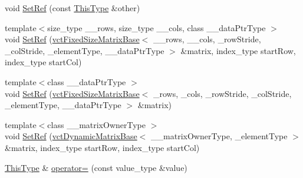 \begin{DoxyCompactItemize}
void \hyperlink{classvct_fixed_size_matrix_ref_aecb4eaa807ae670268091c0473db872e}{Set\-Ref} (const \hyperlink{classvct_fixed_size_matrix_ref_a29a621c8e22f250f9033e539ad219f95}{This\-Type} \&other)
\item 
{\footnotesize template$<$size\-\_\-type \-\_\-\-\_\-rows, size\-\_\-type \-\_\-\-\_\-cols, class \-\_\-\-\_\-data\-Ptr\-Type $>$ }\\void \hyperlink{classvct_fixed_size_matrix_ref_ad738bf0587d297023a179b7c18c9ea4f}{Set\-Ref} (\hyperlink{classvct_fixed_size_matrix_base}{vct\-Fixed\-Size\-Matrix\-Base}$<$ \-\_\-\-\_\-rows, \-\_\-\-\_\-cols, \-\_\-row\-Stride, \-\_\-col\-Stride, \-\_\-element\-Type, \-\_\-\-\_\-data\-Ptr\-Type $>$ \&matrix, index\-\_\-type start\-Row, index\-\_\-type start\-Col)
\item 
{\footnotesize template$<$class \-\_\-\-\_\-data\-Ptr\-Type $>$ }\\void \hyperlink{classvct_fixed_size_matrix_ref_ad34e0c9c7a45009e92ff3a8d83e908f1}{Set\-Ref} (\hyperlink{classvct_fixed_size_matrix_base}{vct\-Fixed\-Size\-Matrix\-Base}$<$ \-\_\-rows, \-\_\-cols, \-\_\-row\-Stride, \-\_\-col\-Stride, \-\_\-element\-Type, \-\_\-\-\_\-data\-Ptr\-Type $>$ \&matrix)
\item 
{\footnotesize template$<$class \-\_\-\-\_\-matrix\-Owner\-Type $>$ }\\void \hyperlink{classvct_fixed_size_matrix_ref_aaafe4fd67b59e37c0ac0fcf9daf2e548}{Set\-Ref} (\hyperlink{classvct_dynamic_matrix_base}{vct\-Dynamic\-Matrix\-Base}$<$ \-\_\-\-\_\-matrix\-Owner\-Type, \-\_\-element\-Type $>$ \&matrix, index\-\_\-type start\-Row, index\-\_\-type start\-Col)
\item 
\hyperlink{classvct_fixed_size_matrix_ref_a29a621c8e22f250f9033e539ad219f95}{This\-Type} \& \hyperlink{classvct_fixed_size_matrix_ref_aed877da27d7869cf3c92b2cdde12e3f0}{operator=} (const value\-\_\-type \&value)
\end{DoxyCompactItemize}
